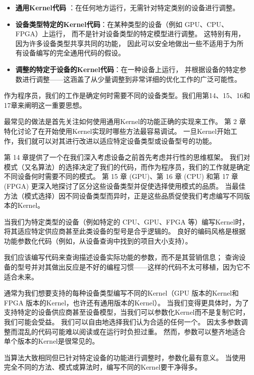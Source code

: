 \begin{itemize}
	\item \textbf{通用Kernel代码} ：在任何地方运行，无需针对特定类别的设备进行调整。

	\item \textbf{设备类型特定的Kernel代码}：在某种类型的设备（例如 GPU、CPU、FPGA）上运行，
	而不是针对设备类型的特定模型进行调整。 这特别有用，因为许多设备类型共享共同的功能，
	因此可以安全地做出一些不适用于为所有设备编写的完全通用代码的假设。

	\item \textbf{调整的特定于设备的Kernel代码}：在一种设备上运行，
	并根据设备的特定参数进行调整——这涵盖了从少量调整到非常详细的优化工作的广泛可能性。
\end{itemize}

\begin{remark}
	作为程序员，我们的工作是确定何时需要不同的设备类型。我们用第14、15、16和17章来阐明这一重要思想。
\end{remark}

最常见的做法是首先关注如何使用通用Kernel的功能正确的实现来工作。 
第 2 章特化讨论了在开始使用Kernel实现时哪些方法最容易调试。 
一旦Kernel开始工作，我们就可以对其进行改进以适应特定设备类型或设备型号的功能。

第 14 章提供了一个在我们深入考虑设备之前首先考虑并行性的思维框架。 
我们对模式（又名算法）的选择决定了我们的代码，而作为程序员，我们的工作就是确定不同设备何时需要不同的模式。 
第 15 章 (GPU)、第 16 章 (CPU) 和第 17 章 (FPGA) 更深入地探讨了区分这些设备类型并促使选择使用模式的品质。 
当最佳方法（模式选择）因不同设备类型而异时，正是这些品质促使我们考虑编写不同版本的Kernel。

当我们为特定类型的设备（例如特定的 CPU、GPU、FPGA 等）编写Kernel时，
将其适应特定供应商甚至此类设备的型号是合乎逻辑的。 
良好的编码风格是根据功能参数化代码（例如，从设备查询中找到的项目大小支持）。

我们应该编写代码来查询描述设备实际功能的参数，而不是其营销信息； 
查询设备的型号并对其做出反应是不好的编程习惯——这样的代码不太可移植，因为它不适合未来。

通常为我们想要支持的每种设备类型编写不同的Kernel（GPU 版本的Kernel和 FPGA 版本的Kernel，也许还有通用版本的Kernel）。 
当我们变得更具体时，为了支持特定的设备供应商甚至设备模型，当我们可以参数化Kernel而不是复制它时，我们可能会受益。 
我们可以自由地选择我们认为合适的任何一个。 因太多参数调整而混乱的代码可能难以阅读或在运行时负担过重。 
然而，参数可以整齐地适合单个版本的Kernel是很常见的。

\begin{remark}
	当算法大致相同但已针对特定设备的功能进行调整时，参数化最有意义。
	当使用完全不同的方法、模式或算法时，编写不同的Kernel要干净得多。
\end{remark}

